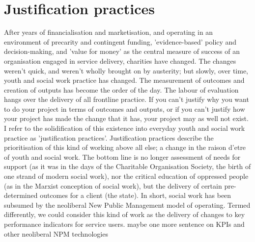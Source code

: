 \section{Justification practices}
After years of financialisation and marketisation, and operating in an environment of precarity and contingent funding, 'evidence-based' policy and decision-making, and 'value for money' as the central measure of success of an organisation engaged in service delivery, charities have changed. The changes weren't quick, and weren't wholly brought on by austerity; but slowly, over time, youth and social work practice has changed. The measurement of outcomes and creation of outputs has become the order of the day. The labour of evaluation hangs over the delivery of all frontline practice. If you can't justify why you want to do your project in terms of outcomes and outputs, or if you can't justify how your project has made the change that it has, your project may as well not exist. I refer to the solidification of this existence into everyday youth and social work practice as 'justification practices'. Justification practices describe the prioritisation of this kind of working above all else; a change in the raison d'etre of youth and social work. The bottom line is no longer assessment of needs for support (as it was in the days of the Charitable Organisation Society, the birth of one strand of modern social work), nor the critical education of oppressed people (as in the Marxist conception of social work), but the delivery of certain pre-determined outcomes for a client (the state). In short, social work has been subsumed by the neoliberal New Public Management model of operating. Termed differently, we could consider this kind of work as the delivery of changes to key performance indicators for service users. maybe one more sentence on KPIs and other neoliberal NPM technologies

